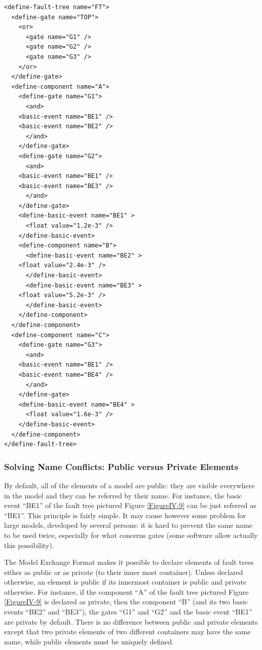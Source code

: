 \documentclass[11pt]{article}
\begin{document}
\begin{lstlisting}
<define-fault-tree name="FT">
  <define-gate name="TOP">
    <or>
      <gate name="G1" />
      <gate name="G2" />
      <gate name="G3" />
    </or>
  </define-gate>
  <define-component name="A">
    <define-gate name="G1">
      <and>
	<basic-event name="BE1" />
	<basic-event name="BE2" />
      </and>
    </define-gate>
    <define-gate name="G2">
      <and>
	<basic-event name="BE1" />
	<basic-event name="BE3" />
      </and>
    </define-gate>
    <define-basic-event name="BE1" >
      <float value="1.2e-3" />
    </define-basic-event>
    <define-component name="B">
      <define-basic-event name="BE2" >
	<float value="2.4e-3" />
      </define-basic-event>
      <define-basic-event name="BE3" >
	<float value="5.2e-3" />
      </define-basic-event>
    </define-component>
  </define-component>
  <define-component name="C">
    <define-gate name="G3">
      <and>
	<basic-event name="BE1" />
	<basic-event name="BE4" />
      </and>
    </define-gate>
    <define-basic-event name="BE4" >
      <float value="1.6e-3" />
    </define-basic-event>
  </define-component>
</define-fault-tree>
\end{lstlisting}




\subsubsection{Solving Name Conflicts: Public versus Private Elements}
\label{sec:org52f3ce3}

By default, all of the elements of a model are public: they are visible
everywhere in the model and they can be referred by their name. For
instance, the basic event ``BE1'' of the fault tree pictured Figure \ref{FigureIV-9}
can be just referred as ``BE1''. This principle is fairly simple. It may
cause however some problem for large models, developed by several
persons: it is hard to prevent the same name to be used twice,
especially for what concerns gates (some software allow actually this
possibility).

The Model Exchange Format makes it possible to declare elements of fault
trees either as public or as private (to their inner most container).
Unless declared otherwise, an element is public if its innermost
container is public and private otherwise. For instance, if the
component ``A'' of the fault tree pictured Figure \ref{FigureIV-9} is declared as
private, then the component ``B'' (and its two basic events ``BE2'' and
``BE3''), the gates ``G1'' and ``G2'' and the basic event ``BE1'' are private by
default. There is no difference between public and private elements
except that two private elements of two different containers may have
the same name, while public elements must be uniquely defined.
\end{document}
